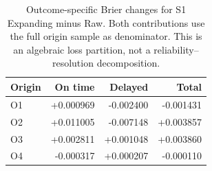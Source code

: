 \begin{table}[t]
\caption{Outcome-specific Brier changes for S1 Expanding minus Raw. Both contributions use the full origin sample as denominator. This is an algebraic loss partition, not a reliability--resolution decomposition.}
\label{tab:decomp}\centering\footnotesize\setlength{\tabcolsep}{4pt}
\begin{tabular}{lrrr}\toprule Origin & On time & Delayed & Total\\\midrule
O1 & +0.000969 & -0.002400 & -0.001431 \\
O2 & +0.011005 & -0.007148 & +0.003857 \\
O3 & +0.002811 & +0.001048 & +0.003860 \\
O4 & -0.000317 & +0.000207 & -0.000110 \\
\bottomrule\end{tabular}\end{table}
